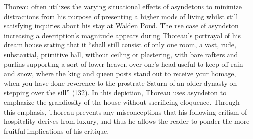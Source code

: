 \documentclass[12pt]{article}
\begin{document}

Thoreau often utilizes the varying situational effects of asyndetons to minimize distractions from his purpose of presenting a higher mode of living whilst still satisfying inquiries about his stay at Walden Pond. The use case of asyndeton increasing a description's magnitude appears during Thoreau's portrayal of his dream house stating that it ``shall still consist of only one room, a vast, rude, substantial, primitive hall, without ceiling or plastering, with bare rafters and purlins supporting a sort of lower heaven over one's head-useful to keep off rain and snow, where the king and queen posts stand out to receive your homage, when you have done reverence to the prostrate Saturn of an older dynasty on stepping over the sill'' (132). In this depiction, Thoreau uses asyndeton to emphasize the grandiosity of the house without sacrificing eloquence. Through this emphasis, Thoreau prevents any misconceptions that his following critism of hospitality derives from luxury, and thus he allows the reader to ponder the more fruitful implications of his critique. 
\end{document}

